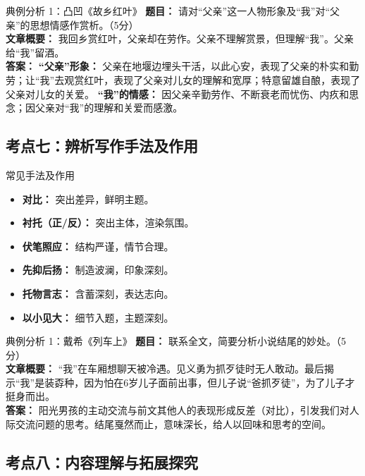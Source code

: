 \documentclass[11pt, a4paper]{ctexart}
\begin{document}
\begin{examplebox}{典例分析 1：凸凹《故乡红叶》}
\textbf{题目：} 请对“父亲”这一人物形象及“我”对“父亲”的思想情感作赏析。（5分）\\
\textbf{文章概要：} 我回乡赏红叶，父亲却在劳作。父亲不理解赏景，但理解“我”。父亲给“我”留酒。\\
\textbf{答案：}
\textbf{“父亲”形象：} 父亲在地堰边埋头干活，以此心安，表现了父亲的朴实和勤劳；让“我”去观赏红叶，表现了父亲对儿女的理解和宽厚；特意留雄自酿，表现了父亲对儿女的关爱。
\textbf{“我”的情感：} 因父亲辛勤劳作、不断衰老而忧伤、内疚和思念；因父亲对“我”的理解和关爱而感激。
\end{examplebox}

\subsection{考点七：辨析写作手法及作用}

\begin{tipsbox}{常见手法及作用}
\begin{itemize}
    \item \textbf{对比：} 突出差异，鲜明主题。
    \item \textbf{衬托（正/反）：} 突出主体，渲染氛围。
    \item \textbf{伏笔照应：} 结构严谨，情节合理。
    \item \textbf{先抑后扬：} 制造波澜，印象深刻。
    \item \textbf{托物言志：} 含蓄深刻，表达志向。
    \item \textbf{以小见大：} 细节入题，主题深刻。
\end{itemize}
\end{tipsbox}

\begin{examplebox}{典例分析 1：戴希《列车上》}
\textbf{题目：} 联系全文，简要分析小说结尾的妙处。（5分）\\
\textbf{文章概要：} “我”在车厢想聊天被冷遇。见义勇为抓歹徒时无人敢动。最后揭示“我”是装孬种，因为怕在6岁儿子面前出事，但儿子说“爸抓歹徒”，为了儿子才挺身而出。\\
\textbf{答案：} 阳光男孩的主动交流与前文其他人的表现形成反差（对比），引发我们对人际交流问题的思考。结尾戛然而止，意味深长，给人以回味和思考的空间。
\end{examplebox}

\subsection{考点八：内容理解与拓展探究}
\end{document}
